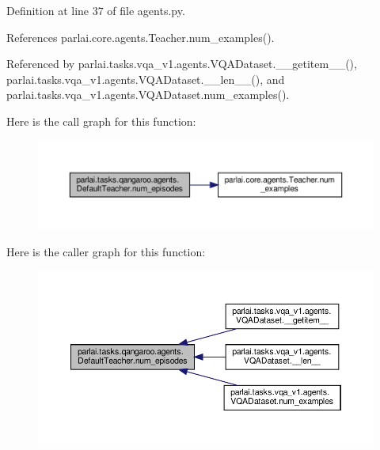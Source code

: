 Definition at line 37 of file agents.\+py.



References parlai.\+core.\+agents.\+Teacher.\+num\+\_\+examples().



Referenced by parlai.\+tasks.\+vqa\+\_\+v1.\+agents.\+V\+Q\+A\+Dataset.\+\_\+\+\_\+getitem\+\_\+\+\_\+(), parlai.\+tasks.\+vqa\+\_\+v1.\+agents.\+V\+Q\+A\+Dataset.\+\_\+\+\_\+len\+\_\+\+\_\+(), and parlai.\+tasks.\+vqa\+\_\+v1.\+agents.\+V\+Q\+A\+Dataset.\+num\+\_\+examples().

Here is the call graph for this function\+:
\nopagebreak
\begin{figure}[H]
\begin{center}
\leavevmode
\includegraphics[width=350pt]{classparlai_1_1tasks_1_1qangaroo_1_1agents_1_1DefaultTeacher_a467ada61caf807815a88abfd6e742799_cgraph}
\end{center}
\end{figure}
Here is the caller graph for this function\+:
\nopagebreak
\begin{figure}[H]
\begin{center}
\leavevmode
\includegraphics[width=350pt]{classparlai_1_1tasks_1_1qangaroo_1_1agents_1_1DefaultTeacher_a467ada61caf807815a88abfd6e742799_icgraph}
\end{center}
\end{figure}
\mbox{\label{classparlai_1_1tasks_1_1qangaroo_1_1agents_1_1DefaultTeacher_a88e8755506c654d988f3071823941b91}} 
